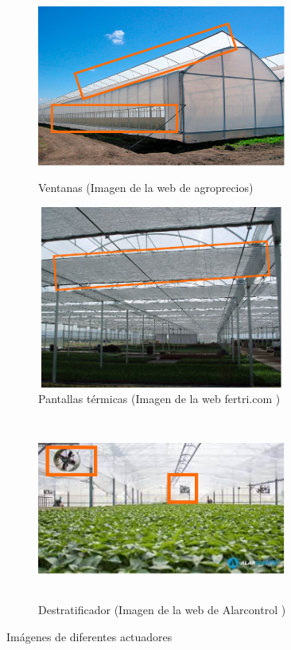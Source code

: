 \begin{figure}[h]
\begin{subfigure}{\textwidth}
\centering
\includegraphics[width=0.9\textwidth, height=6cm]{img/03-Ventana.png}
\caption{Ventanas (Imagen de la web de agroprecios)}
\label{fig:ventanas}
\end{subfigure}
\begin{subfigure}{\textwidth}
\centering
\includegraphics[width=0.9\textwidth, height=6cm]{img/03-PantallaTermica.png}
\caption{Pantallas térmicas (Imagen de la web fertri.com \cite{fertri})}
\label{fig:pantallas-termicas}
\end{subfigure}

\begin{subfigure}{\textwidth}
\centering
\includegraphics[width=0.9\textwidth, height=6cm]{img/03-Destratificador.png}
\caption{Destratificador (Imagen de la web de Alarcontrol \cite{alarcontrol-sl})}
\label{fig:destratificador}
\end{subfigure}

\caption{Imágenes de diferentes actuadores}
\label{fig:imagenes-actuadores}

\end{figure}

